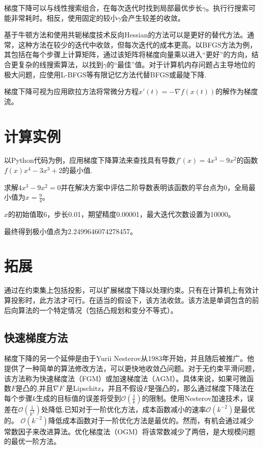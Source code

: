\documentclass[12pt,a4paper]{article}
\begin{document}
梯度下降可以与线性搜索组合，在每次迭代时找到局部最优步长$\gamma$。执行行搜索可能非常耗时。相反，使用固定的较小$\gamma$会产生较差的收敛。

基于牛顿方法和使用共轭梯度技术反向Hessian的方法可以是更好的替代方法。通常，这种方法在较少的迭代中收敛，但每次迭代的成本更高。以BFGS方法为例，其包括在每个步骤上计算矩阵，通过该矩阵将梯度向量乘以进入“更好”的方向，结合更复杂的线搜索算法，以找到$\gamma$的“最佳”值。对于计算机内存问题占主导地位的极大问题，应使用L-BFGS等有限记忆方法代替BFGS或最陡下降.

梯度下降可视为应用欧拉方法将常微分方程$x'(t)=-\nabla f(x(t))$的解作为梯度流。
\section{计算实例}
以Python代码为例，应用梯度下降算法来查找具有导数$f'(x)=4x^3-9x^2$的函数$f(x)x^4-3x^3+2$的最小值.

求解$4x^3-9x^2=0$并在解决方案中评估二阶导数表明该函数的平台点为0，全局最小值为$x=\frac{9}{4}$。

$x$的初始值取6，步长0.01，期望精度0.00001，最大迭代次数设置为10000。

最终得到极小值点为2.2499646074278457。
\section{拓展}
通过在约束集上包括投影，可以扩展梯度下降以处理约束。只有在计算机上有效计算投影时，此方法才可行。在适当的假设下，该方法收敛。该方法是单调包含的前后向算法的一个特定情况（包括凸规划和变分不等式）。

\subsection{快速梯度方法}
梯度下降的另一个延伸是由于Yurii Nesterov从1983年开始，并且随后被推广。他提供了一种简单的算法修改方法，可以更快地收敛凸问题。对于无约束平滑问题，该方法称为快速梯度法（FGM）或加速梯度法（AGM）。具体来说，如果可微函数$F$是凸的,并且$\nabla F$ 是Lipschitz，并且不假设$F$是强凸的，那么通过梯度下降法在每个步骤$k$生成的目标值的误差将受到$\mathcal O\left({\frac {1}{k}}\right)$的限制。使用Nesterov加速技术，误差在$\mathcal O\left({\tfrac {1}{k^{2}}}\right)$处降低.已知对于一阶优化方法，成本函数减小的速率$\mathcal O\left({k^{-2}}\right)$是最优的。 $\mathcal O \left({k^{-2}}\right)$降低成本函数对于一阶优化方法是最优的。然而，有机会通过减少常数因子来改进算法。优化梯度法（OGM）将该常数减少了两倍，是大规模问题的最优一阶方法。
\end{document}
